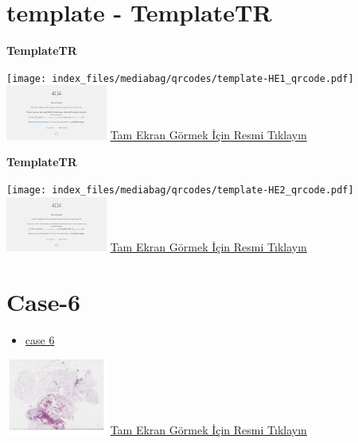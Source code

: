 \documentclass[
  letterpaper,
  DIV=11,
  numbers=noendperiod]{scrreprt}
\providecommand{\tightlist}{%
  \setlength{\itemsep}{0pt}\setlength{\parskip}{0pt}}\usepackage{longtable,booktabs,array}
\begin{document}
\hypertarget{sec-template}{%
\section{template - TemplateTR}\label{sec-template}}

\textbf{TemplateTR}

\texttt{[image: index\_files/mediabag/qrcodes/template-HE1\_qrcode.pdf]}
\href{https://images.patolojiatlasi.com/template/HE1.html}{\includegraphics[width=0.25\textwidth,height=\textheight]{./screenshots/thumbnail_template-HE1.png}}
\href{https://images.patolojiatlasi.com/template/HE1.html}{Tam Ekran
Görmek İçin Resmi Tıklayın}

\textbf{TemplateTR}

\texttt{[image: index\_files/mediabag/qrcodes/template-HE2\_qrcode.pdf]}
\href{https://images.patolojiatlasi.com/template/HE2.html}{\includegraphics[width=0.25\textwidth,height=\textheight]{./screenshots/thumbnail_template-HE2.png}}
\href{https://images.patolojiatlasi.com/template/HE2.html}{Tam Ekran
Görmek İçin Resmi Tıklayın}

\hypertarget{sec-hacettepe-case-of-the-month-case-6}{%
\section{Case-6}\label{sec-hacettepe-case-of-the-month-case-6}}

\begin{itemize}
\tightlist
\item
  \href{https://www.youtube.com/watch?v=ipjRs0h1PnY&ab_channel=KemalKosemehmetoglu}{case
  6}
\end{itemize}

\href{https://images.patolojiatlasi.com/hacettepe-com-case-6/HE.html}{\includegraphics[width=0.25\textwidth,height=\textheight]{./screenshots/thumbnail_hacettepe-com-case-6.png}}
\href{https://images.patolojiatlasi.com/hacettepe-com-case-6/HE.html}{Tam
Ekran Görmek İçin Resmi Tıklayın}
\end{document}
